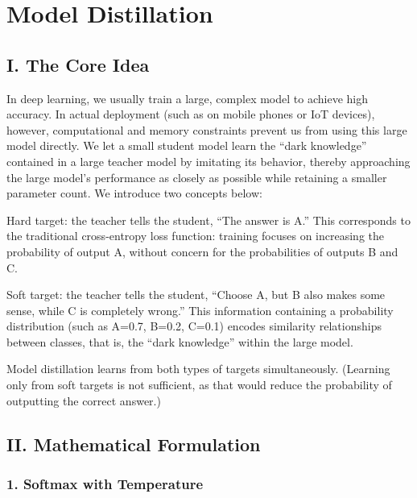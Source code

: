 \setcounter{section}{1}

\hypertarget{model-distillation}{%
\section{Model Distillation}\label{model-distillation}}

\hypertarget{i.-the-core-idea}{%
\subsection{I. The Core Idea}\label{i.-the-core-idea}}

In deep learning, we usually train a large, complex model to achieve high accuracy. In actual deployment (such as on mobile phones or IoT devices), however, computational and memory constraints prevent us from using this large model directly. We let a small student model learn the ``dark knowledge'' contained in a large teacher model by imitating its behavior, thereby approaching the large model's performance as closely as possible while retaining a smaller parameter count. We introduce two concepts below:

Hard target: the teacher tells the student, ``The answer is A.'' This corresponds to the traditional cross-entropy loss function: training focuses on increasing the probability of output A, without concern for the probabilities of outputs B and C.

Soft target: the teacher tells the student, ``Choose A, but B also makes some sense, while C is completely wrong.'' This information containing a probability distribution (such as A=0.7, B=0.2, C=0.1) encodes similarity relationships between classes, that is, the ``dark knowledge'' within the large model.

Model distillation learns from both types of targets simultaneously. (Learning only from soft targets is not sufficient, as that would reduce the probability of outputting the correct answer.)

\hypertarget{ii.-mathematical-formulation-1}{%
\subsection{II. Mathematical Formulation}\label{ii.-mathematical-formulation-1}}

\hypertarget{softmax-with-temperature}{%
\subsubsection{1. Softmax with Temperature}\label{softmax-with-temperature}}

